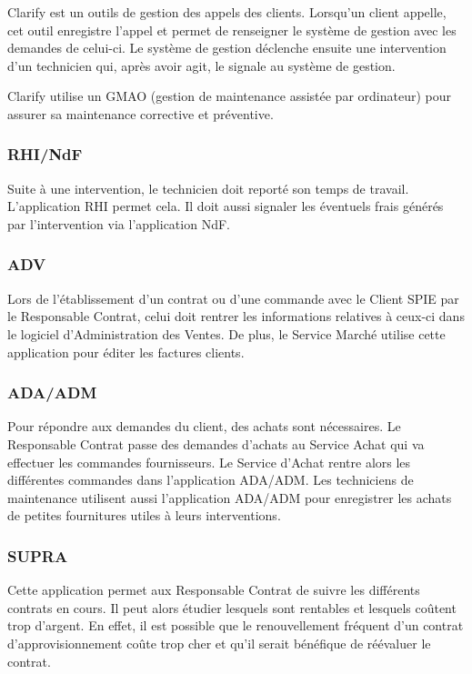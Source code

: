 Clarify est un outils de gestion des appels des clients. Lorsqu'un client appelle, cet outil enregistre l'appel et permet de renseigner le système de gestion avec les demandes de celui-ci. Le système de gestion déclenche ensuite une intervention d'un technicien qui, après avoir agit, le signale au système de gestion.

Clarify utilise un GMAO (gestion de maintenance assistée par ordinateur) pour assurer sa maintenance corrective et préventive.


\subsubsection{RHI/NdF}

Suite à une intervention, le technicien doit reporté son temps de travail. L'application RHI permet cela. Il doit aussi signaler les éventuels frais générés par l'intervention via l'application NdF.

\subsubsection{ADV}

Lors de l'établissement d'un contrat ou d'une commande avec le Client SPIE par le Responsable Contrat, celui doit rentrer les informations relatives à ceux-ci dans le logiciel d'Administration des Ventes.
De plus, le Service Marché utilise cette application pour éditer les factures clients.

\subsubsection{ADA/ADM}

Pour répondre aux demandes du client, des achats sont nécessaires.
Le Responsable Contrat passe des demandes d'achats au Service Achat qui va effectuer les commandes fournisseurs.
Le Service d'Achat rentre alors les différentes commandes dans l'application ADA/ADM.
Les techniciens de maintenance utilisent aussi l'application ADA/ADM pour enregistrer les achats de petites fournitures utiles à leurs interventions.

\subsubsection{SUPRA}

Cette application permet aux Responsable Contrat de suivre les différents contrats en cours. Il peut alors étudier lesquels sont rentables et lesquels coûtent trop d'argent. En effet, il est possible que le renouvellement fréquent d'un contrat d'approvisionnement coûte trop cher et qu'il serait bénéfique de réévaluer le contrat.


